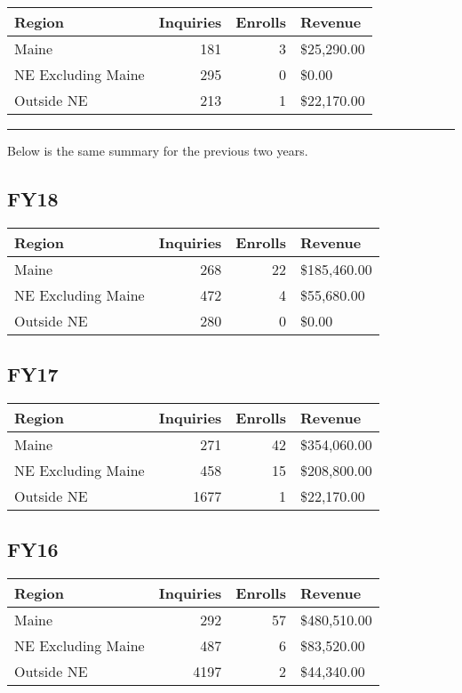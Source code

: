 \documentclass[]{article}
\begin{document}

\begin{longtable}[]{@{}lrrl@{}}
\toprule
Region & Inquiries & Enrolls & Revenue\tabularnewline
\midrule
\endhead
Maine & 181 & 3 & \$25,290.00\tabularnewline
NE Excluding Maine & 295 & 0 & \$0.00\tabularnewline
Outside NE & 213 & 1 & \$22,170.00\tabularnewline
\bottomrule
\end{longtable}

\begin{center}\rule{0.5\linewidth}{\linethickness}\end{center}

Below is the same summary for the previous two years.

\hypertarget{fy18}{%
\subsection{FY18}\label{fy18}}

\begin{longtable}[]{@{}lrrl@{}}
\toprule
Region & Inquiries & Enrolls & Revenue\tabularnewline
\midrule
\endhead
Maine & 268 & 22 & \$185,460.00\tabularnewline
NE Excluding Maine & 472 & 4 & \$55,680.00\tabularnewline
Outside NE & 280 & 0 & \$0.00\tabularnewline
\bottomrule
\end{longtable}

\hypertarget{fy17}{%
\subsection{FY17}\label{fy17}}

\begin{longtable}[]{@{}lrrl@{}}
\toprule
Region & Inquiries & Enrolls & Revenue\tabularnewline
\midrule
\endhead
Maine & 271 & 42 & \$354,060.00\tabularnewline
NE Excluding Maine & 458 & 15 & \$208,800.00\tabularnewline
Outside NE & 1677 & 1 & \$22,170.00\tabularnewline
\bottomrule
\end{longtable}

\hypertarget{fy16}{%
\subsection{FY16}\label{fy16}}

\begin{longtable}[]{@{}lrrl@{}}
\toprule
Region & Inquiries & Enrolls & Revenue\tabularnewline
\midrule
\endhead
Maine & 292 & 57 & \$480,510.00\tabularnewline
NE Excluding Maine & 487 & 6 & \$83,520.00\tabularnewline
Outside NE & 4197 & 2 & \$44,340.00\tabularnewline
\bottomrule
\end{longtable}
\end{document}
